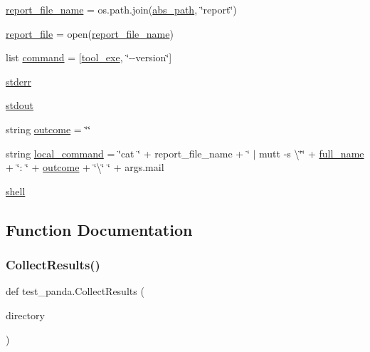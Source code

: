 \begin{DoxyCompactItemize}
\hyperlink{namespacetest__panda_aabd37b93c7c0271be629a4c86bfa7813}{report\+\_\+file\+\_\+name} = os.\+path.\+join(\hyperlink{namespacetest__panda_a78bb23566d04ac65a03195681449d2c0}{abs\+\_\+path}, \char`\"{}report\char`\"{})
\item 
\hyperlink{namespacetest__panda_a551ac2c557ec037c86d5b57afd171c4e}{report\+\_\+file} = open(\hyperlink{namespacetest__panda_aabd37b93c7c0271be629a4c86bfa7813}{report\+\_\+file\+\_\+name})
\item 
list \hyperlink{namespacetest__panda_a0b725fb2964d71bc2ab55b599dbf4f07}{command} = \mbox{[}\hyperlink{namespacetest__panda_aa66614fd26a88bcc42712e9cd7b87797}{tool\+\_\+exe}, \char`\"{}-\/-\/version\char`\"{}\mbox{]}
\item 
\hyperlink{namespacetest__panda_a49ffe05060a5a34634f6a6f4f4e55f20}{stderr}
\item 
\hyperlink{namespacetest__panda_ab9a316faa297fa3703606c6de25a15cc}{stdout}
\item 
string \hyperlink{namespacetest__panda_a39a6d10997e19157bd01ab927a81c044}{outcome} = \char`\"{}\char`\"{}
\item 
string \hyperlink{namespacetest__panda_a2c0d86f1a584ecc5696dbcff1b784583}{local\+\_\+command} = \char`\"{}cat \char`\"{} + report\+\_\+file\+\_\+name + \char`\"{} $\vert$ mutt -\/s \textbackslash{}\char`\"{}\char`\"{} + \hyperlink{namespacetest__panda_a99098d1c922dd11b8a58c871b54d24eb}{full\+\_\+name} + \char`\"{}\+: \char`\"{} + \hyperlink{namespacetest__panda_a39a6d10997e19157bd01ab927a81c044}{outcome} + \char`\"{}\textbackslash{}\char`\"{} \char`\"{} + args.\+mail
\item 
\hyperlink{namespacetest__panda_a7410bf90915081b9dfdb2f34951501e9}{shell}
\end{DoxyCompactItemize}


\subsection{Function Documentation}
\mbox{\label{namespacetest__panda_a1c27d2a971da90549c473b4553865357}} 
\subsubsection{\texorpdfstring{Collect\+Results()}{CollectResults()}}
{\footnotesize\ttfamily def test\+\_\+panda.\+Collect\+Results (\begin{DoxyParamCaption}\item[{}]{directory }\end{DoxyParamCaption})}



